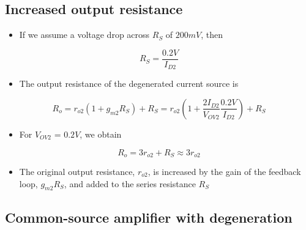 \documentclass[11pt]{article}
\providecommand{\tightlist}{%
      \setlength{\itemsep}{0pt}\setlength{\parskip}{0pt}}
\begin{document}
    \hypertarget{increased-output-resistance}{%
\subsection{Increased output
resistance}\label{increased-output-resistance}}

    \begin{itemize}
\tightlist
\item
  If we assume a voltage drop across \(R_S\) of \(200mV\), then
\end{itemize}

\begin{equation}
R_S = \dfrac{0.2V}{I_{D2}}
\end{equation}

\begin{itemize}
\tightlist
\item
  The output resistance of the degenerated current source is
\end{itemize}

\begin{equation}
R_o = r_{o2}(1+g_{m2} R_S) + R_S = r_{o2} \left(1 + \dfrac{2I_{D2}}{V_{OV2}} \dfrac{0.2V}{I_{D2}} \right)+ R_S
\end{equation}

\begin{itemize}
\tightlist
\item
  For \(V_{OV2}\) = \(0.2V\), we obtain
\end{itemize}

\begin{equation}
R_o = 3r_{o2} + R_S \approx 3r_{o2}
\end{equation}

\begin{itemize}
\tightlist
\item
  The original output resistance, \(r_{o2}\), is increased by the gain
  of the feedback loop, \(g_{m2}R_S\), and added to the series
  resistance \(R_S\)
\end{itemize}

    \hypertarget{common-source-amplifier-with-degeneration}{%
\subsection{Common-source amplifier with
degeneration}\label{common-source-amplifier-with-degeneration}}
\end{document}
